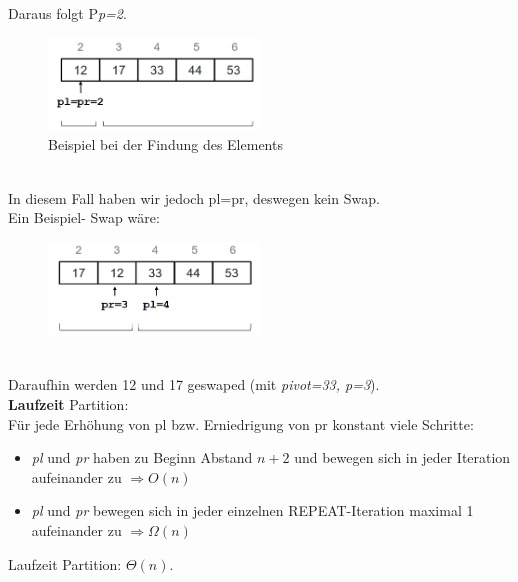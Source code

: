 \documentclass{article}
\begin{document}
            Daraus folgt P\textit{p=2}.\\
            \begin{figure}[ht]
                \centering
                \includegraphics[width=0.5\textwidth]{Bilder/Partition2.png}
                \caption{Beispiel bei der Findung des Elements}
                \label{fig:Partition2}
            \end{figure}\\
            In diesem Fall haben wir jedoch pl=pr, deswegen kein Swap.\\
            Ein Beispiel- Swap wäre:
            \begin{figure}[ht]
                \centering
                \includegraphics[width=0.5\textwidth]{Bilder/Partition3.png}
                \caption{ }
                \label{fig:Partition3}
            \end{figure}\\
            Daraufhin werden 12 und 17 geswaped (mit \textit{pivot=33, p=3}).\\
            \textbf{Laufzeit} Partition:\\
            Für jede Erhöhung von pl bzw. Erniedrigung von pr konstant viele Schritte:
            \begin{itemize}
                \item \textit{pl} und \textit{pr} haben zu Beginn Abstand $n+2$ und bewegen sich in jeder Iteration aufeinander zu $\Rightarrow O(n)$
                \item \textit{pl} und \textit{pr} bewegen sich in jeder einzelnen REPEAT-Iteration maximal 1 aufeinander zu $\Rightarrow \Omega(n)$
            \end{itemize}
            Laufzeit Partition: $\Theta(n)$.
\end{document}
